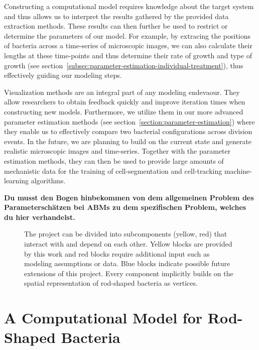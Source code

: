 \documentclass{article}
\begin{document}
Constructing a computational model requires knowledge about the target system and thus allows us to
interpret the results gathered by the provided data extraction methods.
These results can then further be used to restrict or determine the parameters of our model.
For example, by extracing the positions of bacteria across a time-series of microscopic images, we
can also calculate their lengths at these time-points and thus determine their rate of growth and
type of growth (see section~\ref{subsec:parameter-estimation-individual-treatment}), thus
effectively guiding our modeling steps.

Visualization methods are an integral part of any modeling endevaour.
They allow researchers to obtain feedback quickly and improve iteration times when constructing new
models. Furthermore, we utilize them in our more advanced parameter estimation methods (see
section~\ref{section:parameter-estimation}) where they enable us to effectively compare
two bacterial configurations across division events.
In the future, we are planning to build on the current state and generate realistic microscopic
images and time-series.
Together with the parameter estimation methods, they can then be used to provide large amounts of
mechanistic data for the training of cell-segmentation and cell-tracking machine-learning
algorithms.

\textbf{
    Du musst den Bogen hinbekommen von dem allgemeinen Problem des Parameterschätzen bei ABMs zu dem
    spezifischen Problem, welches du hier verhandelst.
}

\begin{figure}
    \centering
    
    \caption{
        The project can be divided into subcomponents (yellow, red) that interact with and depend on
        each other.
        Yellow blocks are provided by this work and red blocks require additional input such as
        modeling assumptions or data.
        Blue blocks indicate possible future extensions of this project.
        Every component implicitly builds on the spatial representation of rod-shaped bacteria as
        vertices.
    }
    \label{fig:flowchart-project-structure}
\end{figure}

\section{A Computational Model for Rod-Shaped Bacteria}
\label{sec:computational-model}
\end{document}
